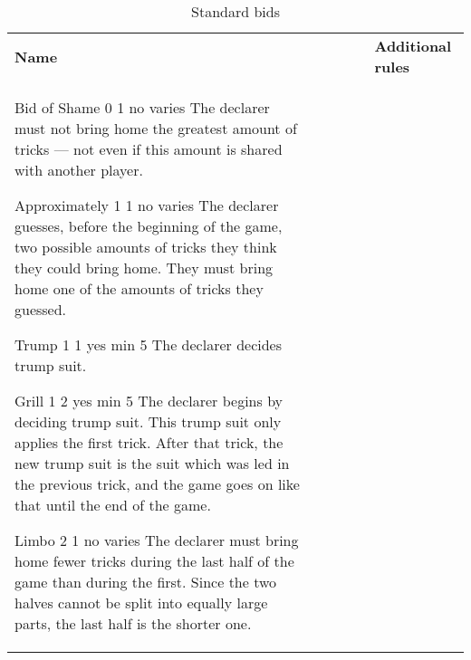 %
%
%
%
%

\begin{table}
	\caption{Standard bids}\label{tab:standardBids}
	\begin{center}
		\begin{tabularx}{\textwidth}{
			l
			S[table-number-alignment=center, table-format=1.0]
			S[table-number-alignment=center, table-format=1.0]
			cc|X
		}
				\textbf{Name} &
				 &
				 &
				 &
				 &
				\textbf{Additional rules}
				\\[-3ex]

				\standardBidItem%
				{Bid of Shame}
				{0}
				{1}
				{no}
				{varies}
				{%
					The declarer must not bring home the greatest amount of tricks --- not even if this amount is shared with another player.
				}

				\standardBidItem%
				{Approximately}
				{1}
				{1}
				{no}
				{varies}
				{%
					The declarer guesses, before the beginning of the game, two possible amounts of tricks they think they could bring home. They must bring home one of the amounts of tricks they guessed.
				}

				\standardBidItem%
				{Trump}
				{1}
				{1}
				{yes}
				{min 5}
				{%
					The declarer decides trump suit.
				}

				\standardBidItem%
				{Grill}
				{1}
				{2}
				{yes}
				{min 5}
				{%
					The declarer begins by deciding trump suit. This trump suit only applies the first trick. After that trick, the new trump suit is the suit which was led in the previous trick, and the game goes on like that until the end of the game.
				}

				\standardBidItem%
				{Limbo}
				{2}
				{1}
				{no}
				{varies}
				{%
					The declarer must bring home fewer tricks during the last half of the game than during the first. Since the two halves cannot be split into equally large parts, the last half is the shorter one.
				}
				

\end{tabularx}
\end{center}
\end{table}
